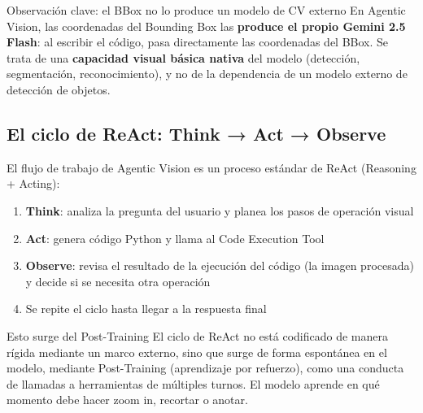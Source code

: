 \begin{warningbox}{Observación clave: el BBox no lo produce un modelo de CV externo}
En Agentic Vision, las coordenadas del Bounding Box las \textbf{produce el propio Gemini 2.5 Flash}: al escribir el código, pasa directamente las coordenadas del BBox. Se trata de una \textbf{capacidad visual básica nativa} del modelo (detección, segmentación, reconocimiento), y no de la dependencia de un modelo externo de detección de objetos.
\end{warningbox}

\subsection{El ciclo de ReAct: Think → Act → Observe}

El flujo de trabajo de Agentic Vision es un proceso estándar de ReAct (Reasoning + Acting):

\begin{enumerate}
    \item \textbf{Think}: analiza la pregunta del usuario y planea los pasos de operación visual
    \item \textbf{Act}: genera código Python y llama al Code Execution Tool
    \item \textbf{Observe}: revisa el resultado de la ejecución del código (la imagen procesada) y decide si se necesita otra operación
    \item Se repite el ciclo hasta llegar a la respuesta final
\end{enumerate}

\begin{knowledgebox}{Esto surge del Post-Training}
El ciclo de ReAct no está codificado de manera rígida mediante un marco externo, sino que surge de forma espontánea en el modelo, mediante Post-Training (aprendizaje por refuerzo), como una conducta de llamadas a herramientas de múltiples turnos. El modelo aprende en qué momento debe hacer zoom in, recortar o anotar.
\end{knowledgebox}

